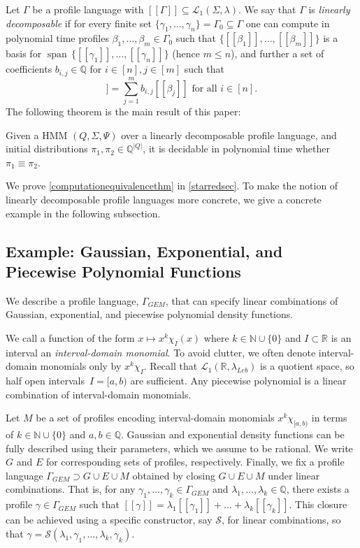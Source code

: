 \documentclass[a4paper,UKenglish,cleveref, autoref,mathscr]{lipics-v2019}
\newcommand{\RR}{\mathbb{R}}
\newcommand{\NN}{\mathbb{N}}
\newcommand{\QQ}{\mathbb{Q}}
\newcommand{\1}{\mathbbm{1}}
\newcommand{\pl}{\Gamma_{\mathit{GEM}}}
\newcommand{\Leb}{\lambda_{\mathit{Leb}}}
\DeclareMathOperator{\Span}{span\,}
\begin{document}
Let $\Gamma$ be a profile language with $[\![\Gamma]\!] \subseteq \mathcal{L}_1(\Sigma, \lambda)$. We say that $\Gamma$ is \emph{linearly decomposable} if for every finite set $\{\gamma_1, \dots, \gamma_n\} = \Gamma_0 \subseteq \Gamma$ one can compute in polynomial time profiles $\beta_1, \dots, \beta_m \in \Gamma_0$ such that $\{[\![\beta_1]\!], \dots, [\![\beta_m]\!]\}$ is a basis for $\Span \{[\![\gamma_1]\!], \dots, [\![\gamma_n]\!]\}$ (hence $m \leq n$), and further a set of coefficients $b_{i,j} \in \QQ$ for $i \in [n], j \in [m]$ such that
\begin{equation*}
[\![\gamma_i]\!] = \sum_{j = 1}^m b_{i,j}[\![\beta_j]\!] \text{ for all $i \in [n]$.}
\end{equation*}
The following theorem is the main result of this paper:
\begin{theorem}\label{computationequivalencethm}
Given a HMM $(Q, \Sigma, \Psi)$ over a linearly decomposable profile language, and initial distributions $\pi_1, \pi_2 \in \QQ^{|Q|}$, it is decidable in polynomial time whether $\pi_1 \equiv \pi_2$.
\end{theorem}
We prove \cref{computationequivalencethm} in \cref{starredsec}.
To make the notion of linearly decomposable profile languages more concrete, we give a concrete example in the following subsection.

\subsection{Example: Gaussian, Exponential, and Piecewise Polynomial Functions} \label{sub-profile-example}

We describe a profile language, $\pl$, that can specify linear combinations of Gaussian, exponential, and piecewise polynomial density functions.

We call a function of the form $x \mapsto x^k \chi_{I}(x)$ where $k \in \NN \cup \{0\}$ and $I \subset \RR$ is an interval an \emph{interval-domain monomial}.
To avoid clutter, we often denote interval-domain monomials only by $x^k \chi_I$.
Recall that $\mathcal{L}_1(\RR, \Leb)$ is a quotient space, so half open intervals~$I = [a,b)$ are sufficient. Any piecewise polynomial is a linear combination of interval-domain monomials.

Let $M$ be a set of profiles encoding interval-domain monomials $x^k \chi_{[a,b)}$ in terms of $k \in \NN \cup \{0\}$ and $a,b \in \QQ$. Gaussian and exponential density functions can be fully described using their parameters, which we assume to be rational. We write $G$ and $E$ for corresponding sets of profiles, respectively.
%
Finally, we fix a profile language $\pl \supset G \cup E \cup M$ obtained by closing $G \cup E \cup M$ under linear combinations. That is, for any $\gamma_1, \dots, \gamma_k \in \pl$ and $\lambda_1, \dots, \lambda_k \in \QQ$, there exists a profile $\gamma \in \pl$ such that $[\![\gamma]\!] = \lambda_1 [\![\gamma_1]\!] + \dots + \lambda_k [\![\gamma_k]\!]$.
This closure can be achieved using a specific constructor, say $\mathcal{S}$, for linear combinations, so that $\gamma = \mathcal{S}(\lambda_1, \gamma_1, \ldots, \lambda_k, \gamma_k)$.
\end{document}
